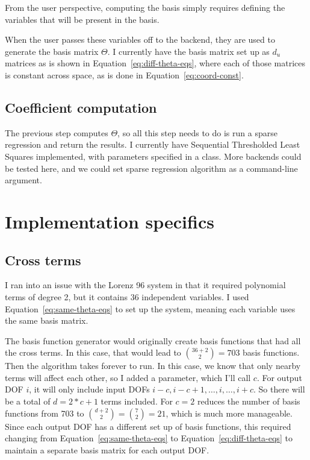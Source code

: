 \documentclass{article}
\def\lstinline#1{}%
\begin{document}
From the user perspective, computing the basis simply requires defining the variables
that will be present in the basis.

When the user passes these variables off to the backend, they are used to
generate the basis matrix $\Theta$.
I currently have the basis matrix set up as $d_u$ matrices as is shown in Equation~\ref{eq:diff-theta-eqs}, where
each of those matrices is constant across space, as is done in Equation~\ref{eq:coord-const}.


\subsection{Coefficient computation}

The previous step computes $\Theta$, so all this step needs to do is run a
sparse regression and return the results. I currently have Sequential
Thresholded Least Squares implemented, with parameters specified in a
\lstinline{SparseReg} class. More backends could be tested here, and we could
set sparse regression algorithm as a command-line argument.

\section{Implementation specifics}

\subsection{Cross terms}
I ran into an issue with the Lorenz 96 system in that it required polynomial
terms of degree 2, but it contains 36 independent variables. I used
Equation~\ref{eq:same-theta-eqs} to set up the system, meaning each variable
uses the same basis matrix.

The basis function generator would originally create basis functions that had
all the cross terms. In this case, that would lead to $\binom{36 + 2}{2} = 703$
basis functions. Then the algorithm takes forever to run. In this case, we know
that only nearby terms will affect each other, so I added a
\lstinline{cross_term_range} parameter, which I'll call $c$. For output DOF $i$,
it will only include input DOFs $i-c,i-c+1,\hdots,i,\hdots,i+c$. So there will
be a total of $d = 2*c+1$ terms included. For $c=2$ reduces the number of basis
functions from 703 to $\binom{d+2}{2} = \binom{7}{2} = 21$, which is much more
manageable. Since each output DOF has a different set up of basis functions,
this required changing from Equation~\ref{eq:same-theta-eqs} to
Equation~\ref{eq:diff-theta-eqs} to maintain a separate basis matrix for each
output DOF.
\end{document}
